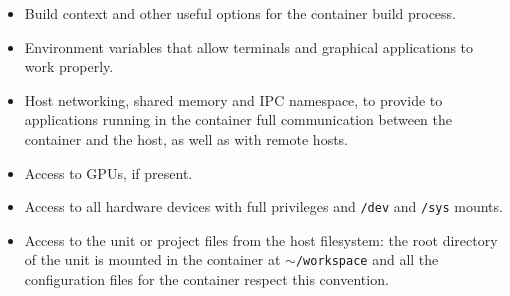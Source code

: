 \begin{itemize}
  \item Build context and other useful options for the container build process.
  \item Environment variables that allow terminals and graphical applications to work properly.
  \item Host networking, shared memory and IPC namespace, to provide to applications running in the container full communication between the container and the host, as well as with remote hosts.
  \item Access to GPUs, if present.
  \item Access to all hardware devices with full privileges and \texttt{/dev} and \texttt{/sys} mounts.
  \item Access to the unit or project files from the host filesystem: the root directory of the unit is mounted in the container at \texttt{$\sim$/workspace} and all the configuration files for the container respect this convention.
\end{itemize}
